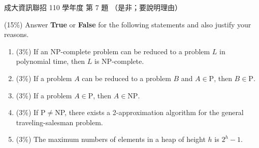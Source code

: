 \begin{pastexam}[label={px:ncku-110-prog-07}]{成大資訊聯招 110 學年度 第 7 題}
（是非；要說明理由）

(15\%) Answer \textbf{True} or \textbf{False} for the following statements and also justify your
reasons.
\begin{enumerate}[label=(\arabic*),itemsep=0pt,topsep=2pt]
\item (3\%) If an NP-complete problem can be reduced to a problem $L$ in polynomial time, then
$L$ is NP-complete.
\item (3\%) If a problem $A$ can be reduced to a problem $B$ and $A\in\mathrm{P}$, then
$B\in\mathrm{P}$.
\item (3\%) If a problem $A\in\mathrm{P}$, then $A\in\mathrm{NP}$.
\item (3\%) If P$\neq$NP, there exists a 2-approximation algorithm for the general
traveling-salesman problem.
\item (3\%) The maximum numbers of elements in a heap of height $h$ is $2^h-1$.
\end{enumerate}
\end{pastexam}

